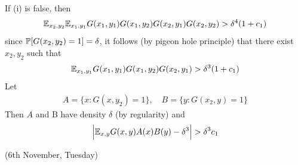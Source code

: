 \documentclass[10pt,a4paper]{report}
\newenvironment{proof}
{\begin{changemargin}{1cm}{0.5cm}
	}%
	{\end{changemargin}
}
\begin{document}
\begin{proof}
\begin{itemize}
\quad If (i) is false, then
\begin{align*}
\mathbb{E}_{x_2,y_2} \mathbb{E}_{x_1,y_1} G(x_1,y_1) G(x_1,y_2) G(x_2,y_1) G(x_2,y_2) > \delta^4 (1+c_1)
\end{align*}
since $\mathbb{P} [G(x_2,y_2)=1] = \delta$, it follows (by pigeon hole principle) that there exist $x_2, y_2$ such that
\begin{align*}
\mathbb{E}_{x_1,y_1} G(x_1, y_1) G(x_1,y_2) G(x_2, y_1) > \delta^3(1+c_1)
\end{align*}
Let
\begin{align*}
A = \{x: G(x,y_2) =1 \}, \quad B= \{ y: G(x_2,y) =1 \}
\end{align*}
Then $A$ and B have density $\delta$ (by regularity) and
\begin{align*}
\Big| \mathbb{E}_{x,y} G(x,y) A(x) B(y) -\delta^3 \Big| > \delta^3 c_1
\end{align*}
\end{itemize}
\end{proof}
\s

\newday

(6th November, Tuesday)
\s
\end{document}
